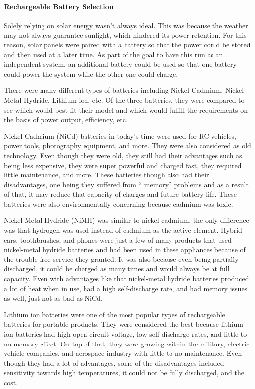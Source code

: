 \paragraph{Rechargeable Battery Selection}
Solely relying on solar energy wasn’t always ideal. This was because the weather may not always guarantee sunlight, which hindered its power retention. For this reason, solar panels were paired with a battery so that the power could be stored and then used at a later time. As part of the goal to have this run as an independent system, an additional battery could be used so that one battery could power the system while the other one could charge.

There were many different types of batteries including Nickel-Cadmium, Nickel-Metal Hydride, Lithium ion, etc. Of the three batteries, they were compared to see which would best fit their model and which would fulfill the requirements on the basis of power output, efficiency, etc.

Nickel Cadmium (NiCd) batteries in today’s time were used for RC vehicles, power tools, photography equipment, and more. They were also considered as old technology. Even though they were old, they still had their advantages such as being less expensive, they were super powerful and charged fast, they required little maintenance, and more. These batteries though also had their disadvantages, one being they suffered from “ memory” problems and as a result of that, it may reduce that capacity of charges and future battery life. These batteries were also environmentally concerning because cadmium was toxic.

Nickel-Metal Hydride (NiMH) was similar to nickel cadmium, the only difference was that hydrogen was used instead of cadmium as the active element. Hybrid cars, toothbrushes, and phones were just a few of many products that used nickel-metal hydride batteries and had been used in these appliances because of the trouble-free service they granted. It was also because even being partially discharged, it could be charged as many times and would always be at full capacity. Even with advantages like that nickel-metal hydride batteries produced a lot of heat when in use, had a high self-discharge rate, and had memory issues as well, just not as bad as NiCd.

Lithium ion batteries were one of the most popular types of rechargeable batteries for portable products. They were considered the best because lithium ion batteries had high open circuit voltage, low self-discharge rates, and little to no memory effect. On top of that, they were growing within the military, electric vehicle companies, and aerospace industry with little to no maintenance. Even though they had a lot of advantages, some of the disadvantages included sensitivity towards high temperatures, it could not be fully discharged, and the cost.

